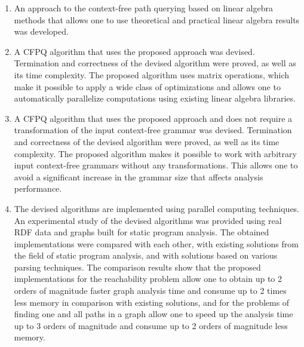 
{}
\begin{enumerate}[beginpenalty=10000] %
    \item An approach to the context-free path querying based on linear algebra methods that allows one to use theoretical and practical linear algebra results was developed.
    \item A CFPQ algorithm that uses the proposed approach was devised. Termination and correctness of the devised algorithm were proved, as well as its time complexity. The proposed algorithm uses matrix operations, which make it possible to apply a wide class of optimizations and allows one to automatically parallelize computations using existing linear algebra libraries.
    \item A CFPQ algorithm that uses the proposed approach and does not require a transformation of the input context-free grammar was devised. Termination and correctness of the devised algorithm were proved, as well as its time complexity. The proposed algorithm makes it possible to work with arbitrary input context-free grammars without any transformations. This allows one to avoid a significant increase in the grammar size that affects analysis performance.
    \item The devised algorithms are implemented using parallel computing techniques. An experimental study of the devised algorithms was provided using real RDF data and graphs built for static program analysis. The obtained implementations were compared with each other, with existing solutions from the field of static program analysis, and with solutions based on various parsing techniques. The comparison results show that the proposed implementations for the reachability problem allow one to obtain up to 2 orders of magnitude faster graph analysis time and consume up to 2 times less memory in comparison with existing solutions, and for the problems of finding one and all paths in a graph allow one to speed up the analysis time up to 3 orders of magnitude and consume up to 2 orders of magnitude less memory.
\end{enumerate}
